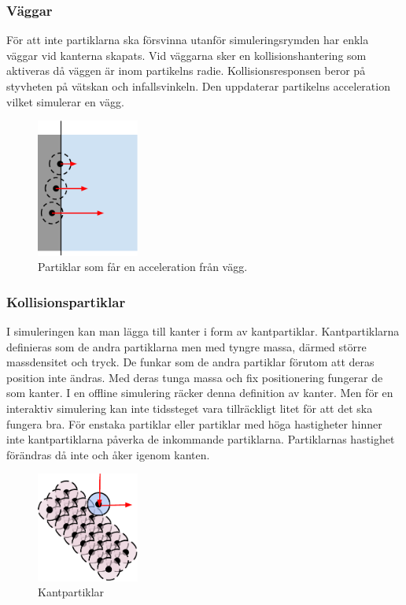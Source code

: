 \documentclass[a4paper,12pt,oneside,final]{extarticle}
\begin{document}
\subsubsection{Väggar}
För att inte partiklarna ska försvinna utanför simuleringsrymden har enkla väggar vid kanterna skapats.
Vid väggarna sker en kollisionshantering som aktiveras då väggen är inom partikelns radie.
Kollisionsresponsen beror på styvheten på vätskan och infallsvinkeln.
Den uppdaterar partikelns acceleration vilket simulerar en vägg.
\begin{figure}[H]
  \centering
    \includegraphics[width=0.3\textwidth]{bilder/partiklar_vagg}
  \caption{Partiklar som får en acceleration från vägg.}
\end{figure}

\subsubsection{Kollisionspartiklar}
I simuleringen kan man lägga till kanter i form av kantpartiklar.
Kantpartiklarna definieras som de andra partiklarna men med tyngre massa, därmed större massdensitet och tryck.
De funkar som de andra partiklar förutom att deras position inte ändras.
Med deras tunga massa och fix positionering fungerar de som kanter.
I en offline simulering räcker denna definition av kanter.
Men för en interaktiv simulering kan inte tidssteget vara tillräckligt litet för att det ska fungera bra.
För enstaka partiklar eller partiklar med höga hastigheter hinner inte kantpartiklarna påverka de inkommande partiklarna.
Partiklarnas hastighet förändras då inte och åker igenom kanten. 

\begin{figure}[H]
  \centering
    \includegraphics[width=0.3\textwidth]{bilder/partiklar_kolpart}
  \caption{Kantpartiklar}
\end{figure}
\end{document}
